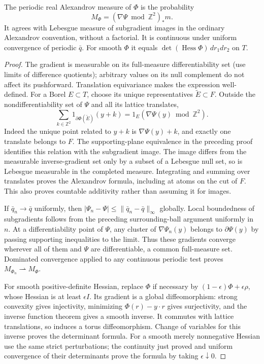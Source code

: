 \begin{lemma}\label{newrad:Alex}
The periodic real Alexandrov measure of $\Phi$ is the probability
\[
 M_\Phi=(\nabla\Psi\bmod\mathbb Z^2)_*m.
\]
It agrees with Lebesgue measure of subgradient images in the ordinary
Alexandrov convention, without a factorial. It is continuous under
uniform convergence of periodic $\bar q$. For smooth $\Phi$ it equals
$\det(\operatorname{Hess}\Phi)\,dr_1dr_2$ on $T$.
\end{lemma}
\begin{proof}
The gradient is measurable on its full-measure differentiability set
(use limits of difference quotients); arbitrary values on its null
complement do not affect its pushforward. Translation equivariance
makes the expression well-defined. For a Borel $E\subset T$, choose
its unique representatives $\widetilde E\subset F$. Outside the
nondifferentiability set of $\Psi$ and all its lattice translates,
\[
 \sum_{k\in\mathbb Z^2}
 1_{\partial\Phi(\widetilde E)}(y+k)
 =1_E(\nabla\Psi(y)\bmod\mathbb Z^2).
\]
Indeed the unique point related to $y+k$ is $\nabla\Psi(y)+k$, and
exactly one translate belongs to $F$. The supporting-plane equivalence
in the preceding proof identifies this relation with the subgradient
image. The image differs from the measurable inverse-gradient set
only by a subset of a Lebesgue null set, so is Lebesgue measurable in
the completed measure. Integrating and summing over translates proves
the Alexandrov formula, including at atoms on the cut of $F$. This
also proves countable additivity rather than assuming it for images.

If $\bar q_n\to\bar q$ uniformly, then
$|\Psi_n-\Psi|\le\|\bar q_n-\bar q\|_\infty$ globally. Local
boundedness of subgradients follows from the preceding surrounding-ball
argument uniformly in $n$. At a differentiability point of $\Psi$,
any cluster of $\nabla\Psi_n(y)$ belongs to $\partial\Psi(y)$ by
passing supporting inequalities to the limit. Thus these gradients
converge wherever all of them and $\Psi$ are differentiable, a common
full-measure set. Dominated convergence applied to any continuous
periodic test proves $M_{\Phi_n}\rightharpoonup M_\Phi$.

For smooth positive-definite Hessian, replace $\Phi$ if necessary by
$(1-\epsilon)\Phi+\epsilon\rho$, whose Hessian is at least
$\epsilon I$. Its gradient is a global diffeomorphism: strong
convexity gives injectivity, minimizing $\Phi(r)-y\cdot r$ gives
surjectivity, and the inverse function theorem gives a smooth inverse.
It commutes with lattice translations, so induces a torus
diffeomorphism. Change of variables for this inverse proves the
determinant formula. For a smooth merely nonnegative Hessian use the
same strict perturbations; the continuity just proved and uniform
convergence of their determinants prove the formula by taking
$\epsilon\downarrow0$.
\end{proof}

